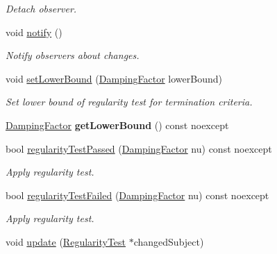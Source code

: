 \begin{DoxyCompactItemize}
\begin{DoxyCompactList}\small\item\em \-Detach observer. \end{DoxyCompactList}\item 
\hypertarget{classSpacy_1_1Mixin_1_1MixinConnection_a1ddeaa78a3bb4a38c2cca36d1f99fe36}{void \hyperlink{classSpacy_1_1Mixin_1_1MixinConnection_a1ddeaa78a3bb4a38c2cca36d1f99fe36}{notify} ()}\label{classSpacy_1_1Mixin_1_1MixinConnection_a1ddeaa78a3bb4a38c2cca36d1f99fe36}

\begin{DoxyCompactList}\small\item\em \-Notify observers about changes. \end{DoxyCompactList}\item 
\hypertarget{classSpacy_1_1Mixin_1_1RegularityTest_a682ce022b0b5493e48f50f693ed64082}{void \hyperlink{classSpacy_1_1Mixin_1_1RegularityTest_a682ce022b0b5493e48f50f693ed64082}{set\-Lower\-Bound} (\hyperlink{classSpacy_1_1DampingFactor}{\-Damping\-Factor} lower\-Bound)}\label{classSpacy_1_1Mixin_1_1RegularityTest_a682ce022b0b5493e48f50f693ed64082}

\begin{DoxyCompactList}\small\item\em \-Set lower bound of regularity test for termination criteria. \end{DoxyCompactList}\item 
\hypertarget{classSpacy_1_1Mixin_1_1RegularityTest_a576995201badbfaee2064bf0d7749257}{\hyperlink{classSpacy_1_1DampingFactor}{\-Damping\-Factor} {\bfseries get\-Lower\-Bound} () const noexcept}\label{classSpacy_1_1Mixin_1_1RegularityTest_a576995201badbfaee2064bf0d7749257}

\item 
bool \hyperlink{classSpacy_1_1Mixin_1_1RegularityTest_acb6b3e8c76ebdbded0ec610959513caf}{regularity\-Test\-Passed} (\hyperlink{classSpacy_1_1DampingFactor}{\-Damping\-Factor} nu) const noexcept
\begin{DoxyCompactList}\small\item\em \-Apply regularity test. \end{DoxyCompactList}\item 
bool \hyperlink{classSpacy_1_1Mixin_1_1RegularityTest_aeb1a3b051bafc9da9be1df354c652812}{regularity\-Test\-Failed} (\hyperlink{classSpacy_1_1DampingFactor}{\-Damping\-Factor} nu) const noexcept
\begin{DoxyCompactList}\small\item\em \-Apply regularity test. \end{DoxyCompactList}\item 
\hypertarget{classSpacy_1_1Mixin_1_1RegularityTest_a1a6191e20f84025cec8b10ec63ab94ac}{void \hyperlink{classSpacy_1_1Mixin_1_1RegularityTest_a1a6191e20f84025cec8b10ec63ab94ac}{update} (\hyperlink{classSpacy_1_1Mixin_1_1RegularityTest_a548d9d45c31c7833266bd3b20dc1aa7e}{\-Regularity\-Test} $\ast$changed\-Subject)}\label{classSpacy_1_1Mixin_1_1RegularityTest_a1a6191e20f84025cec8b10ec63ab94ac}


\end{DoxyCompactItemize}
